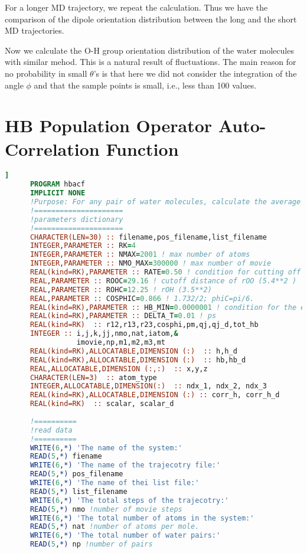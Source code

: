 For a longer MD trajectory, we repeat the calculation. Thus we have the comparison of the dipole orientation distribution between 
the long and the short MD trajectories.

Now we calculate the O-H group orientation distribution of the water molecules with similar mehod.
This is a natural result of fluctuations. The main reason for no probability in small $\theta$'s is
that here we did not consider the integration of the angle $\phi$ and that the sample points is small, i.e., less than 100 values.


\section{HB Population Operator Auto-Correlation Function}
\begin{lstlisting}[language=fortran]                  ]
      PROGRAM hbacf
      IMPLICIT NONE 
      !Purpose: For any pair of water molecules, calculate the average of h(t) and functions S_HB(t), S_d_HB(t), C_HB(t) and C_d_HB(t).
      !=====================
      !parameters dictionary
      !=====================
      CHARACTER(LEN=30) :: filename,pos_filename,list_filename 
      INTEGER,PARAMETER :: RK=4              
      INTEGER,PARAMETER :: NMAX=2001 ! max number of atoms
      INTEGER,PARAMETER :: NMO_MAX=300000 ! max number of movie
      REAL(kind=RK),PARAMETER :: RATE=0.50 ! condition for cutting off autocorrelation functions
      REAL,PARAMETER :: ROOC=29.16 ! cutoff distance of rOO (5.4**2 )
      REAL,PARAMETER :: ROHC=12.25 ! rOH (3.5**2)
      REAL,PARAMETER :: COSPHIC=0.866 ! 1.732/2; phiC=pi/6.
      REAL(kind=RK),PARAMETER :: HB_MIN=0.0000001 ! condition for the existence of h-bond
      REAL(kind=RK),PARAMETER :: DELTA_T=0.01 ! ps
      REAL(kind=RK)  :: r12,r13,r23,cosphi,pm,qj,qj_d,tot_hb
      INTEGER :: i,j,k,jj,nmo,nat,iatom,& 
                 imovie,np,m1,m2,m3,mt 
      REAL(kind=RK),ALLOCATABLE,DIMENSION (:)  :: h,h_d
      REAL(kind=RK),ALLOCATABLE,DIMENSION (:)  :: hb,hb_d
      REAL,ALLOCATABLE,DIMENSION (:,:)  :: x,y,z
      CHARACTER(LEN=3)  :: atom_type  
      INTEGER,ALLOCATABLE,DIMENSION(:)  :: ndx_1, ndx_2, ndx_3
      REAL(kind=RK),ALLOCATABLE,DIMENSION (:) :: corr_h, corr_h_d
      REAL(kind=RK)  :: scalar, scalar_d 
      
      !==========
      !read data
      !==========
      WRITE(6,*) 'The name of the system:'
      READ(5,*) fiename
      WRITE(6,*) 'The name of the trajecotry file:'
      READ(5,*) pos_filename     
      WRITE(6,*) 'The name of thei list file:'
      READ(5,*) list_filename    
      WRITE(6,*) 'The total steps of the trajecotry:'
      READ(5,*) nmo !number of movie steps
      WRITE(6,*) 'The total number of atoms in the system:'
      READ(5,*) nat !number of atoms per mole.
      WRITE(6,*) 'The total number of water pairs:'
      READ(5,*) np !number of pairs   


\end{lstlisting}
